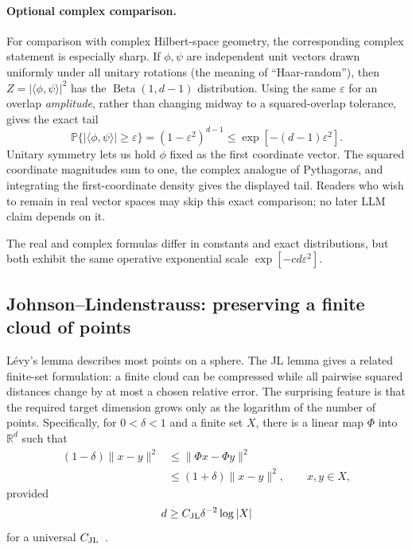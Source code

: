 \documentclass[
  aps,
  reprint,
  superscriptaddress,
  floatfix,
  nofootinbib,
  longbibliography
]{revtex4-2}
\newcommand{\R}{\mathbb{R}}
\newcommand{\Prob}{\mathbb{P}}
\newcommand{\norm}[1]{\lVert #1 \rVert}
\begin{document}
\paragraph{Optional complex comparison.}
For comparison with complex Hilbert-space geometry, the corresponding complex
statement is especially sharp.  If $\phi,\psi$ are independent unit vectors
drawn uniformly under all unitary rotations (the meaning of ``Haar-random''), then
$Z=|\langle\phi,\psi\rangle|^2$ has the
$\operatorname{Beta}(1,d-1)$ distribution.  Using the same
$\varepsilon$ for an overlap \emph{amplitude}, rather than changing midway to
a squared-overlap tolerance, gives the exact tail
\begin{equation}
\label{eq:complex-haar-tail}
\Prob\{|\langle\phi,\psi\rangle|\geq\varepsilon\}
=(1-\varepsilon^2)^{d-1}
\leq
\exp[-(d-1)\varepsilon^2].
\end{equation}
Unitary symmetry lets us hold $\phi$ fixed as the first coordinate vector.
The squared coordinate magnitudes sum to one, the complex analogue of
Pythagoras, and integrating the first-coordinate density gives the displayed
tail.  Readers who wish to remain in real vector spaces may skip this exact
comparison; no later LLM claim depends on it.

The real and complex formulas differ in constants and exact distributions,
but both exhibit the same operative exponential scale
$\exp[-c d\varepsilon^2]$.

\subsection{Johnson--Lindenstrauss: preserving a finite cloud of points}
\label{sec:jl}

L\'evy's lemma describes most points on a sphere.  The JL lemma gives a related
finite-set formulation: a finite cloud can be compressed while all pairwise
squared distances change by at most a chosen relative error.  The surprising
feature is that the required target dimension grows only as the logarithm of
the number of points.  Specifically, for
$0<\delta<1$ and a finite set $X$, there is a linear map
$\Phi$ into $\R^d$ such that
\begin{equation}
\label{eq:jl}
\begin{aligned}
(1-\delta)\norm{x-y}^2
&\leq\norm{\Phi x-\Phi y}^2\\
&\leq(1+\delta)\norm{x-y}^2,
\qquad x,y\in X,
\end{aligned}
\end{equation}
provided
\begin{equation}
\label{eq:jl-dimension}
d\geq C_{\rm JL}\delta^{-2}\log |X|
\end{equation}
for a universal $C_{\rm JL}$~\cite{johnson-1984,Dasgupta-2003}.
\end{document}
